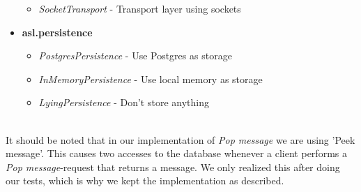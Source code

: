 \documentclass{article}
\begin{document}
\begin{itemize}
\begin{itemize}
                    \item \textit{SocketTransport} - Transport layer using sockets
                \end{itemize}
                \item \textbf{asl.persistence}
                \begin{itemize}
                    \item \textit{PostgresPersistence} - Use Postgres as storage
                    \item \textit{InMemoryPersistence} - Use local memory as storage
                    \item \textit{LyingPersistence} - Don't store anything
                \end{itemize}
            \end{itemize}
            ~\\
            It should be noted that in our implementation of \textit{Pop message} we are using 'Peek message'. This causes two accesses to the database whenever a client performs a \textit{Pop message}-request that returns a message. We only realized this after doing our tests, which is why we kept the implementation as described.
\end{document}
